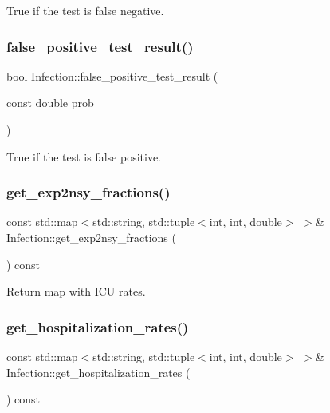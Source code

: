 True if the test is false negative. 

\mbox{\label{classInfection_af19ee6eae6168a5028dd4c261a6e109a}} 
\subsubsection{\texorpdfstring{false\+\_\+positive\+\_\+test\+\_\+result()}{false\_positive\_test\_result()}}
{\footnotesize\ttfamily bool Infection\+::false\+\_\+positive\+\_\+test\+\_\+result (\begin{DoxyParamCaption}\item[{const double}]{prob }\end{DoxyParamCaption})}



True if the test is false positive. 

\mbox{\label{classInfection_ab7245d95e87c6f7721770506218b93fe}} 
\subsubsection{\texorpdfstring{get\+\_\+exp2nsy\+\_\+fractions()}{get\_exp2nsy\_fractions()}}
{\footnotesize\ttfamily const std\+::map$<$std\+::string, std\+::tuple$<$int, int, double$>$ $>$\& Infection\+::get\+\_\+exp2nsy\+\_\+fractions (\begin{DoxyParamCaption}{ }\end{DoxyParamCaption}) const\hspace{0.3cm}{\ttfamily [inline]}}



Return map with I\+CU rates. 

\mbox{\label{classInfection_aa6c5bd4852e85ab81319df5dd85526bf}} 
\subsubsection{\texorpdfstring{get\+\_\+hospitalization\+\_\+rates()}{get\_hospitalization\_rates()}}
{\footnotesize\ttfamily const std\+::map$<$std\+::string, std\+::tuple$<$int, int, double$>$ $>$\& Infection\+::get\+\_\+hospitalization\+\_\+rates (\begin{DoxyParamCaption}{ }\end{DoxyParamCaption}) const\hspace{0.3cm}{\ttfamily [inline]}}



